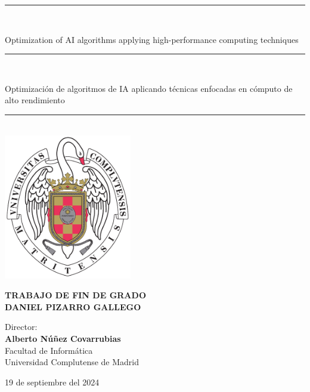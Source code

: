 \begin{titlepage}
	\thispagestyle{empty}
	
	\begin{center}
		
		\vspace{1cm}
		
		\vspace{0.65cm}
		\rule{2in}{0.5pt}\\
		\vspace{0.85cm}
		
		{\Large Optimization of AI algorithms applying high-performance computing techniques}\\
		
		\vspace{0.65cm}
		\rule{2in}{0.5pt}\\
		\vspace{0.85cm}
		
		{\Large Optimización de algoritmos de IA aplicando técnicas enfocadas en cómputo de alto rendimiento}\\
		
		\vspace{0.65cm}
		\rule{2in}{0.5pt}\\
		
		
		
		\vfill
		\includegraphics[height=2.5in]{images/escudo_ucm.pdf}
		\vfill
		
		
		
		\textbf{TRABAJO DE FIN DE GRADO}\\
		\vspace{0.7cm}
		\textbf{DANIEL PIZARRO GALLEGO}
		
		\vspace{1cm}
		
		Director:\\
		\textbf{Alberto Núñez Covarrubias}\\
		
		\vspace{1.8cm}
		Facultad de Informática\\
		Universidad Complutense de Madrid
		\vspace{0.5cm}
		
		19 de septiembre del 2024
		
		\vspace{0.2cm}
		
	\end{center}
\end{titlepage}